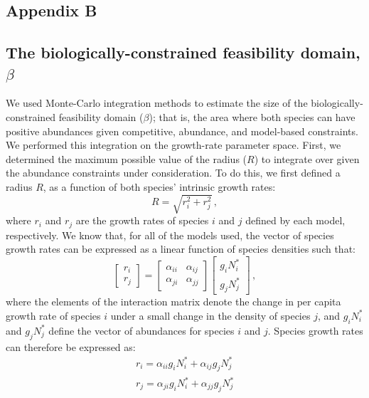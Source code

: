 \begin{refsection}
\chapter{Appendix B} %
\label{appendix_B}


\section*{The biologically-constrained feasibility domain, $\beta$}
We used Monte-Carlo integration methods to estimate the size of the biologically-constrained feasibility domain ($\beta$); that is, the area where both species can have positive abundances given competitive, abundance, and model-based constraints. We performed this integration on the growth-rate parameter space. First, we determined the maximum possible value of the radius ($R$) to integrate over given the abundance constraints under consideration. To do this, we first defined a radius $R$,  as a function of both species' intrinsic growth rates:
\begin{equation}
  R = \sqrt{r_{i}^{2} + r_{j}^{2}} \,,
\end{equation}
where  $r_{i}$ and $r_{j}$ are the growth rates of species $i$ and $j$ defined by each model, respectively. We know that, for all of the models used, the vector of species growth rates can be expressed as a linear function of species densities such that:
\begin{equation}
\begin{bmatrix}
r_{i} \\
r_{j}
\end{bmatrix} =
\begin{bmatrix}
\alpha_{ii} & \alpha_{ij} \\
\alpha_{ji} & \alpha_{jj}
\end{bmatrix}
\begin{bmatrix}
g_{i}N_{i}^{*}\\ g_{j}N_{j}^{*}
\end{bmatrix} \,,
\end{equation}
where the elements of the interaction matrix denote the change in per capita growth rate of species $i$ under a small change in the density of species $j$, and $g_{i}N_{i}^{*}$ and $g_{j}N_{j}^{*}$ define the vector of abundances for species $i$ and $j$. Species growth rates can therefore be expressed as:
\begin{eqnarray}
  r_{i} = \alpha_{ii}g_{i}N_{i}^{*} + \alpha_{ij}g_{j}N_{j}^{*}\\
  r_{j} = \alpha_{ji}g_{i}N_{i}^{*} +\alpha_{jj}g_{j}N_{j}^{*}
\end{eqnarray}


\end{refsection}
